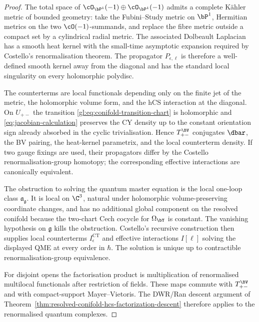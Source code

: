 \begin{proof}
The total space of \(\cO_{\bP^1}(-1)\oplus\cO_{\bP^1}(-1)\) admits a
complete K\"ahler metric of bounded geometry: take the Fubini--Study
metric on \(\bP^1\), Hermitian metrics on the two \(\cO(-1)\)-summands,
and replace the fibre metric outside a compact set by a cylindrical
radial metric.  The associated Dolbeault Laplacian has a smooth heat
kernel with the small-time asymptotic expansion required by
Costello's renormalisation theorem.  The propagator
\(P_{\epsilon,\ell}\) is therefore a well-defined smooth kernel away
from the diagonal and has the standard local singularity on every
holomorphic polydisc.

The counterterms are local functionals depending only on the finite jet
of the metric, the holomorphic volume form, and the hCS interaction at
the diagonal.  On \(U_{+-}\) the transition
\eqref{gl:eq:conifold-transition-chart} is holomorphic and
\eqref{eq:jacobian-calculation} preserves the CY density up to the
constant orientation sign already absorbed in the cyclic
trivialisation.  Hence \(T_{+-}^{\BV}\) conjugates
\(\dbar\), the BV pairing, the heat-kernel parametrix, and the local
counterterm density.  If two gauge fixings are used, their propagators
differ by the Costello renormalisation-group homotopy; the corresponding
effective interactions are canonically equivalent.

The obstruction to solving the quantum master equation is the local
one-loop class \(\mathfrak a_{\mathfrak g}\).  It is local on
\(\C^3\), natural under holomorphic volume-preserving coordinate
changes, and has no additional global component on the resolved conifold
because the two-chart Cech cocycle for \(\Omega_{\bY}\) is constant.
The vanishing hypothesis on \(\mathfrak g\) kills the obstruction.
Costello's recursive construction then supplies local counterterms
\(I^{\mathrm{CT}}_\epsilon\) and effective interactions \(I[\ell]\)
solving the displayed QME at every order in \(\hbar\).  The solution is
unique up to contractible renormalisation-group equivalence.

For disjoint opens the factorisation product is multiplication of
renormalised multilocal functionals after restriction of fields.  These
maps commute with \(T_{+-}^{\BV}\) and with compact-support
Mayer--Vietoris.  The DWR/Ran descent argument of
Theorem~\ref{thm:resolved-conifold-hcs-factorization-descent} therefore
applies to the renormalised quantum complexes.
\end{proof}

